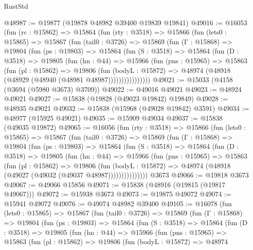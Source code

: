 \begin{lexlean}{RustStd}
\begin{coremodule}
@48987 := @19877 (@19878 @48982 @39400 @19839 @19841)
@49016 := @16053
    (fun (rc : @15862) =>
    @15864
      (fun (rty : @3518) =>
      @15866
        (fun (lets0 : @15865) =>
        @15867
          (fun (tail0 : @3726) =>
          @15869
            (fun (Γ : @15868) =>
            @19804
              (fun (ps : @19803) =>
              @15864
                (fun (S : @3518) =>
                @15864
                  (fun (D : @3518) =>
                  @19805
                    (fun (hn : @44) =>
                    @15966
                      (fun (pns : @15965) =>
                      @15863
                        (fun (pl : @15862) =>
                        @19806
                          (fun (bodyL : @15872) =>
                          @48974 (@48918 (@48929 (@48940 (@48981 @48987))))))))))))))))
@49021 := @15033 (@4158 (@3694 (@5980 @3673) @3709))
@49022 := @49016 @49021
@49023 := @48924 @49021
@49027 := @15838 (@19828 (@49023 @19842) @19849)
@49028 := @48935 @49021
@49032 := @15838 (@15968 (@49028 @19842) @3591)
@49034 := @48977 (@15925 @49021)
@49035 := @15909 @49034
@49037 := @15838 (@49035 @19872)
@49065 := @16056
    (fun (rty : @3518) =>
    @15866
      (fun (lets0 : @15865) =>
      @15867
        (fun (tail0 : @3726) =>
        @15869
          (fun (Γ : @15868) =>
          @19804
            (fun (ps : @19803) =>
            @15864
              (fun (S : @3518) =>
              @15864
                (fun (D : @3518) =>
                @19805
                  (fun (hn : @44) =>
                  @15966
                    (fun (pns : @15965) =>
                    @15863
                      (fun (pl : @15862) =>
                      @19806
                        (fun (bodyL : @15872) =>
                        @48974 (@48918 (@49027 (@49032 (@49037 @48987)))))))))))))))
    @3673
@49066 := @19818 @3673
@49067 := @49066 @15856
@49071 := @15838 (@48916 (@19815 (@19817 @49067)))
@49072 := @15938 @3673
@49073 := @19875 @49072
@49074 := @15941 @49072
@49076 := @49074 @48982 @39400
@49105 := @16078
    (fun (lets0 : @15865) =>
    @15867
      (fun (tail0 : @3726) =>
      @15869
        (fun (Γ : @15868) =>
        @19804
          (fun (ps : @19803) =>
          @15864
            (fun (S : @3518) =>
            @15864
              (fun (D : @3518) =>
              @19805
                (fun (hn : @44) =>
                @15966
                  (fun (pns : @15965) =>
                  @15863
                    (fun (pl : @15862) =>
                    @19806
                      (fun (bodyL : @15872) =>
                      @48974

\end{coremodule}
\end{lexlean}
